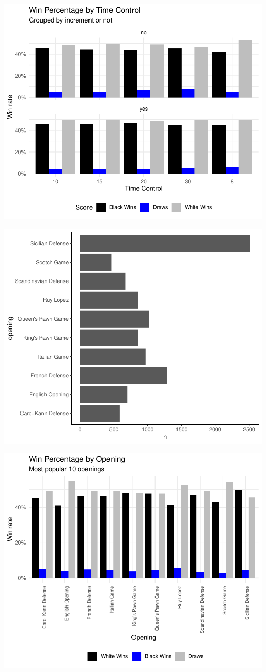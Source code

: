 \documentclass[11pt,preprint, authoryear]{elsarticle}
\numberwithin{equation}{section}
\numberwithin{figure}{section}
\numberwithin{table}{section}
\begin{document}
\includegraphics{WriteUp_files/figure-latex/Descriptives3-1.pdf}

\includegraphics{WriteUp_files/figure-latex/Descriptive4-1.pdf}

\includegraphics{WriteUp_files/figure-latex/unnamed-chunk-1-1.pdf}
\end{document}
